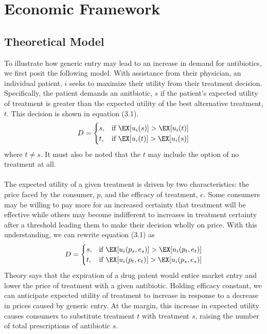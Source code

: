 \chapter{Economic Framework}
\section{Theoretical Model}
To illustrate how generic entry may lead to an increase in demand for antibiotics, we first posit the following model. With assistance from their physician, an individual patient, $i$ seeks to maximize their utility from their treatment decision. Specifically, the patient demands an anitbiotic, $s$ if the patient's expected utility of treatment is greater than the expected utility of the best alternative treatment, $t$. This decision is shown in equation (3.1).
\begin{eqnarray}
  D =
  \begin{cases}
                                   s, & \text{if }\EX[u_i(s)] > \EX[u_i(t)] \\
                                   t, & \text{if }\EX[u_i(t)] > \EX[u_i(s)] \\
  \end{cases}
\end{eqnarray}
where $t \neq s$. It must also be noted that the $t$ may include the option of no treatment at all.\\
\\
\indent The expected utility of a given treatment is driven by two characteristics: the price faced by the consumer, $p$, and the efficacy of treatment, $e$. Some consumers may be willing to pay more for an increased certainty that treatment will be effective while others may become indifferent to increases in treatment certainty after a threshold leading them to make their decision wholly on price. With this understanding, we can rewrite equation (3.1) as
\begin{eqnarray}
  D =
  \begin{cases}
                                   s, & \text{if }\EX[u_i(p_s,e_s)] > \EX[u_i(p_t,e_t)] \\
                                   t, & \text{if }\EX[u_i(p_t,e_t)] > \EX[u_i(p_s,e_s)] \\
  \end{cases}
\end{eqnarray}
 Theory says that the expiration of a drug patent would entice market entry and lower the price of treatment with a given antibiotic. Holding efficacy constant, we can anticipate expected utility of treatment to increase in response to a decrease in prices caused by generic entry. At the margin, this increase in expected utility causes consumers to substitute \cite{train_discrete_nodate, templeton_household_2008} treatment $t$ with treatment $s$, raising the number of total prescriptions of antibiotic $s$. %
